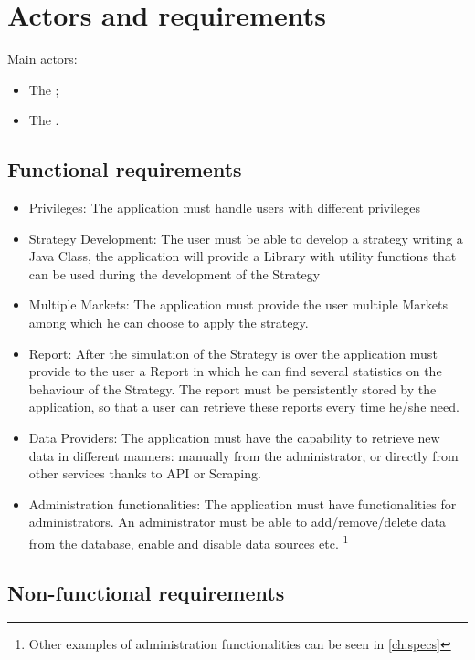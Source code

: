 \chapter{Actors and requirements}\label{ch:requirements}

Main actors:
\begin{itemize}
	\item The ;
	\item The .
\end{itemize}

\section{Functional requirements}\label{sec:functionalrequirements}

\begin{itemize}
	\item Privileges: The application must handle users with different privileges
	\item Strategy Development: The user must be able to develop a strategy writing a Java Class, the application will provide a Library with utility functions that can be used during the development of the Strategy
	\item Multiple Markets: The application must provide the user multiple Markets among which he can choose to apply the strategy.
	\item Report: After the simulation of the Strategy is over the application must provide to the user a Report in which he can find several statistics on the behaviour of the Strategy. The report must be persistently stored by the application, so that a user can retrieve these reports every time he/she need.
	\item Data Providers: The application must have the capability to retrieve new data in different manners: manually from the administrator, or directly from other services thanks to API or Scraping.
	\item Administration functionalities: The application must have functionalities for administrators. An administrator must be able to add/remove/delete data from the database, enable and disable data sources etc. \footnote{Other examples of administration functionalities can be seen in \ref{ch:specs}}
\end{itemize}

\section{Non-functional requirements}\label{sec:nonfunctionalrequirements}

